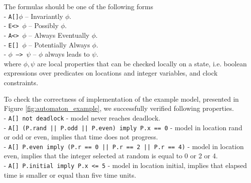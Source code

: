 \begin{definition}
The formulas should be one of the following forms\\
- \texttt{A[]$\phi$} -- Invariantly $\phi$.\\
- \texttt{E<> $\phi$} -- Possibly $\phi$.\\
- \texttt{A<> $\phi$} -- Always Eventually $\phi$.\\
- \texttt{E[] $\phi$} -- Potentially Always $\phi$.\\
- \texttt{$\phi$ --> $\psi$} -- $\phi$ always leads to $\psi$.\\
where $\phi, \psi$ are local properties that can be checked locally on a state, i.e. boolean expressions over predicates on locations and integer variables, and clock constraints.
\label{def:quantifiers}
\end{definition}
\noindent
To check the correctness of implementation of the example model, presented in Figure \ref{fig:automaton_example}, we successfully verified following properties.\\
- \texttt{A[] not deadlock} - model never reaches deadlock.\\
- \texttt{A[] (P.rand || P.odd || P.even) imply P.x == 0} - model in location rand or odd or even, implies that time does not progress.\\
- \texttt{A[] P.even imply (P.r == 0 || P.r == 2 || P.r == 4)} -  model in location even, implies that the integer selected at random is equal to 0 or 2 or 4.\\
- \texttt{A[] P.initial imply P.x <= 5} - model in location initial, implies that elapsed time is smaller or equal than five time units.